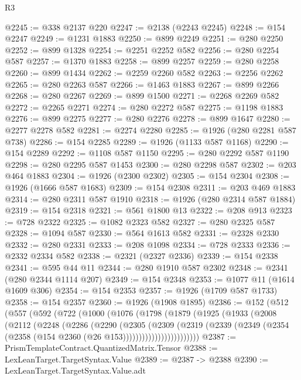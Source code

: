 \begin{lexlean}{R3}
\begin{coremodule}
@2245 := @338 @2137 @220
@2247 := @2138 (@2243 @2245)
@2248 := @154 @2247
@2249 := @1231 @1883
@2250 := @899 @2249
@2251 := @280 @2250
@2252 := @899 @1328
@2254 := @2251 @2252 @582
@2256 := @280 @2254 @587
@2257 := @1370 @1883
@2258 := @899 @2257
@2259 := @280 @2258
@2260 := @899 @1434
@2262 := @2259 @2260 @582
@2263 := @2256 @2262
@2265 := @280 @2263 @587
@2266 := @1463 @1883
@2267 := @899 @2266
@2268 := @280 @2267
@2269 := @899 @1500
@2271 := @2268 @2269 @582
@2272 := @2265 @2271
@2274 := @280 @2272 @587
@2275 := @1198 @1883
@2276 := @899 @2275
@2277 := @280 @2276
@2278 := @899 @1647
@2280 := @2277 @2278 @582
@2281 := @2274 @2280
@2285 := @1926 (@280 @2281 @587 @738)
@2286 := @154 @2285
@2289 := @1926 (@1133 @587 @1168)
@2290 := @154 @2289
@2292 := @1108 @587 @1150
@2295 := @280 @2292 @587 @1190
@2298 := @280 @2295 @587 @1453
@2300 := @280 @2298 @587
@2302 := @203 @464 @1883
@2304 := @1926 (@2300 @2302)
@2305 := @154 @2304
@2308 := @1926 (@1666 @587 @1683)
@2309 := @154 @2308
@2311 := @203 @469 @1883
@2314 := @280 @2311 @587 @1910
@2318 := @1926 (@280 @2314 @587 @1884)
@2319 := @154 @2318
@2321 := @561 @1800 @13
@2322 := @208 @913
@2323 := @728 @2322
@2325 := @1082 @2323 @582
@2327 := @280 @2325 @587
@2328 := @1094 @587
@2330 := @564 @1613 @582
@2331 := @2328 @2330
@2332 := @280 @2331
@2333 := @208 @1098
@2334 := @728 @2333
@2336 := @2332 @2334 @582
@2338 := @2321 (@2327 @2336)
@2339 := @154 @2338
@2341 := @595 @44 @11
@2344 := @280 @1910 @587 @2302
@2348 := @2341 (@280 @2344 @1114 @207)
@2349 := @154 @2348
@2353 := @1077 @11 (@1614 @1609 @306)
@2354 := @154 @2353
@2357 := @1926 (@1709 @587 @1733)
@2358 := @154 @2357
@2360 := @1926 (@1908 @1895)
@2386 := @152
    (@512
      (@557
        (@592
          (@722
            (@1000
              (@1076
                (@1798
                  (@1879
                    (@1925
                      (@1933
                        (@2008
                          (@2112
                            (@2248
                              (@2286
                                (@2290
                                  (@2305
                                    (@2309
                                      (@2319
                                        (@2339
                                          (@2349
                                            (@2354
                                              (@2358 (@154 @2360 (@26 @153))))))))))))))))))))))))
@2387 := PrismTemplateContract.QuantizedMatrix.Tensor
@2388 := LexLeanTarget.TargetSyntax.Value
@2389 := @2387 -> @2388
@2390 := LexLeanTarget.TargetSyntax.Value.adt

\end{coremodule}
\end{lexlean}
